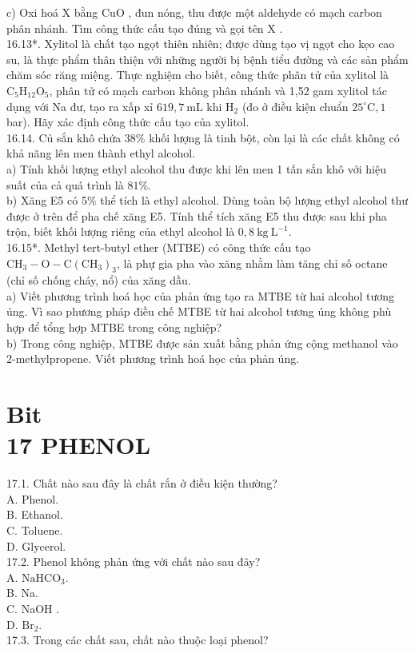 \documentclass[10pt]{article}
\begin{document}
c) Oxi hoá X bằng CuO , đun nóng, thu được một aldehyde có mạch carbon phân nhánh. Tìm công thức cấu tạo đúng và gọi tên X .\\
16.13*. Xylitol là chất tạo ngọt thiên nhiên; được dùng tạo vị ngọt cho kẹo cao su, là thực phẩm thân thiện với những người bị bệnh tiểu đường và các sản phẩm chăm sóc răng miệng. Thực nghiệm cho biết, công thức phân tử của xylitol là $\mathrm{C}_{5} \mathrm{H}_{12} \mathrm{O}_{5}$, phân tử có mạch carbon không phân nhánh và 1,52 gam xylitol tác dụng với Na đư, tạo ra xấp xỉ $619,7 \mathrm{~mL}$ khi $\mathrm{H}_{2}$ (đo ở điều kiện chuẩn $25^{\circ} \mathrm{C}, 1$ bar). Hãy xác định công thức cấu tạo của xylitol.\\
16.14. Củ sắn khô chứa $38 \%$ khối lượng là tinh bột, còn lại là các chất không có khả năng lên men thành ethyl alcohol.\\
a) Tính khối lượng ethyl alcohol thu được khi lên men 1 tấn sắn khô với hiệu suất của cả quá trình là $81 \%$.\\
b) Xăng E5 có 5\% thể tích là ethyl alcohol. Dùng toàn bộ lượng ethyl alcohol thư được ở trên để pha chế xăng E5. Tính thể tích xăng E5 thu được sau khi pha trộn, biết khối lượng riêng của ethyl alcohol là $0,8 \mathrm{~kg} \mathrm{~L}^{-1}$.\\
16.15*. Methyl tert-butyl ether (MTBE) có công thức cấu tạo $\mathrm{CH}_{3}-\mathrm{O}-\mathrm{C}\left(\mathrm{CH}_{3}\right)_{3}$, là phự gia pha vào xăng nhằm làm tăng chỉ số octane (chỉ số chống cháy, nổ) của xăng dầu.\\
a) Viết phương trình hoá học của phản ứng tạo ra MTBE từ hai alcohol tương úng. Vì sao phương pháp điều chế MTBE từ hai alcohol tương úng không phù hợp để tổng hợp MTBE trong công nghiệp?\\
b) Trong công nghiệp, MTBE được sản xuất bằng phản ứng cộng methanol vào 2-methylpropene. Viết phương trình hoá học của phản úng.

\section*{Bit \\
 17 PHENOL}
17.1. Chất nào sau đây là chất rắn ở điều kiện thường?\\
A. Phenol.\\
B. Ethanol.\\
C. Toluene.\\
D. Glycerol.\\
17.2. Phenol không phản ứng với chất nào sau đây?\\
A. $\mathrm{NaHCO}_{3}$.\\
B. Na.\\
C. NaOH .\\
D. $\mathrm{Br}_{2}$.\\
17.3. Trong các chất sau, chất nào thuộc loại phenol?
\end{document}

